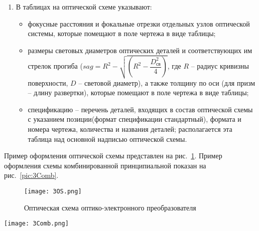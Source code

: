 \begin{enumerate}
\begin{itemize}
		\item габаритные или сборочные размеры, например длину базы, высоту выноса (при необходимости).
	\end{itemize}
	\item В таблицах на оптической схеме указывают:
	\begin{itemize}
		\item фокусные расстояния и фокальные отрезки отдельных узлов оптической системы, которые помещают в поле чертежа в виде таблицы;
		\item  размеры световых диаметров оптических деталей и соответствующих им стрелок прогиба ($ sag = R^2 - \sqrt{(R^2 - \dfrac{D^2_\text{св}}{4})} $, где $ R $ -- радиус кривизны поверхности, $ D $ -- световой диаметр), а также толщину по оси (для призм -- длину развертки), которые помещают в поле чертежа в виде таблицы; 
		\item спецификацию -- перечень деталей, входящих в состав оптической схемы с указанием позиции(формат спецификации стандартный), формата и номера чертежа, количества и названия деталей; 
		располагается эта таблица над основной надписью оптической схемы.
	\end{itemize}
\end{enumerate}

Пример оформления оптической схемы представлен на рис.~\ref{pic:3OS}. Пример оформления схемы комбинированной принципиальной показан на рис.~\ref{pic:3Comb}.

\begin{figure}[h!]
	\texttt{[image: 3OS.png]}
	\label{pic:3OS}
	\caption{Оптическая схема оптико-электронного преобразователя}
\end{figure}

\begin{figure*}[h!]
	\texttt{[image: 3Comb.png]}
	\label{pic:3Comb}
	\caption{Схема комбинированная принципиальная}
\end{figure*}